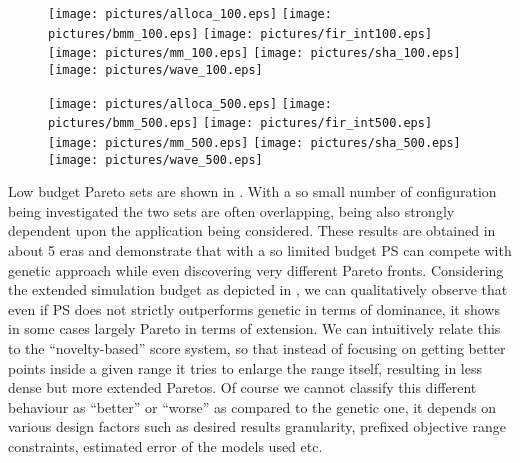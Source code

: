 \begin{figure}
  \begin{center}
    \texttt{[image: pictures/alloca\_100.eps]}
    \texttt{[image: pictures/bmm\_100.eps]}
    \texttt{[image: pictures/fir\_int100.eps]}
    \texttt{[image: pictures/mm\_100.eps]}
    \texttt{[image: pictures/sha\_100.eps]}
    \texttt{[image: pictures/wave\_100.eps]} 
  \end{center}
\end{figure}

\begin{figure}
  \begin{center}
    \texttt{[image: pictures/alloca\_500.eps]}
    \texttt{[image: pictures/bmm\_500.eps]}
    \texttt{[image: pictures/fir\_int500.eps]}
    \texttt{[image: pictures/mm\_500.eps]}
    \texttt{[image: pictures/sha\_500.eps]}
    \texttt{[image: pictures/wave\_500.eps]} 
  \end{center}
\end{figure}

Low budget Pareto sets are shown in . With a so small number of
configuration being investigated the two sets are often overlapping,
being also strongly dependent upon the application being considered.
These results are obtained in about 5 eras and demonstrate that with a so limited budget PS can compete with
genetic approach while even discovering very different Pareto fronts. 
Considering the extended simulation budget as depicted in
, we can qualitatively observe that
even if PS does not strictly outperforms genetic in terms of dominance, it shows in
some cases largely Pareto in terms of extension. We can intuitively
relate this to the ``novelty-based'' score system, so that instead of
focusing on getting better points inside a given range it tries to
enlarge the range itself, resulting in less dense but more extended
Paretos. Of course we cannot classify this different behaviour as
``better'' or ``worse'' as compared to the genetic one, it depends on
various design factors such as desired results granularity, prefixed objective
range constraints, estimated error of the models used etc.


